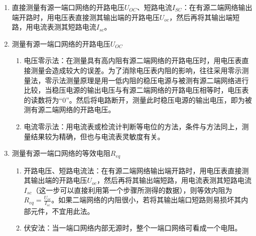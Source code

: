 \documentclass[dvipsnames, svgnames,a4paper,11pt]{article}
\begin{document}
	\begin{enumerate}
		\item 直接测量有源一端口网络的开路电压$U_{OC}$、短路电流$I_{SC}$：在有源二端网络输出端开路时，用电压表直接测其输出端的开路电压$U_{oc}$，然后再将其输出端短路，用电流表测其短路电流$I_{sc}$。
		

		\begin{figure}[htbp]
			\centering
			\quad
			\quad
			\label{fig:graph10}
		\end{figure}


		\item 测量有源一端口网络的开路电压$U_{OC}$
		\begin{enumerate}
			\item 电压零示法：在测量具有高内阻有源二端网络的开路电压时，用电压表直接测量会造成较大的误差。为了消除电压表内阻的影响，往往采用零示测量法，零示法测量原理是用一低内阻的稳压电源与被测有源二端网络进行比较，当稳压电源的输出电压与有源二端网络的开路电压相等时，电压表的读数将为“0”。然后将电路断开，测量此时稳压电源的输出电压，即为被测有源二端网络的开路电压。

			\item 电流零示法：用电流表或检流计判断等电位的方法，条件与方法同上，测量结果较为精确，但也与电流表灵敏度有关。
		\end{enumerate}
		

		\item 测量有源一端口网络的等效电阻$R_{eq}$
		\begin{enumerate}
			\item 开路电压、短路电流法：在有源二端网络输出端开路时，用电压表直接测其输出端的开路电压$U_{oc}$，然后再将其输出端短路，用电流表测其短路电流$I_{sc}$（这一步可以直接利用第一个步骤所测得的数据），则等效内阻为$R_{eq}=\frac{U_{oc}}{I_{sc}}$。如果二端网络的内阻很小，若将其输出端口短路则易损坏其内部元件，不宜用此法。
			\item 伏安法：当一端口网络内部无源时，整个一端口网络可看成一个电阻。
			

\end{enumerate}
\end{enumerate}
\end{document}
